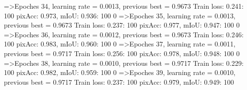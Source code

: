 =>Epoches 34, learning rate = 0.0013,                 previous best = 0.9673
Train loss: 0.241: 100%
pixAcc: 0.973, mIoU: 0.936: 100%
  0%
=>Epoches 35, learning rate = 0.0013,                 previous best = 0.9673
Train loss: 0.237: 100%
pixAcc: 0.977, mIoU: 0.947: 100%
  0%
=>Epoches 36, learning rate = 0.0012,                 previous best = 0.9673
Train loss: 0.246: 100%
pixAcc: 0.983, mIoU: 0.960: 100%
  0%
=>Epoches 37, learning rate = 0.0011,                 previous best = 0.9717
Train loss: 0.256: 100%
pixAcc: 0.978, mIoU: 0.948: 100%
  0%
=>Epoches 38, learning rate = 0.0010,                 previous best = 0.9717
Train loss: 0.229: 100%
pixAcc: 0.982, mIoU: 0.959: 100%
  0%
=>Epoches 39, learning rate = 0.0010,                 previous best = 0.9717
Train loss: 0.237: 100%
pixAcc: 0.979, mIoU: 0.949: 100%
